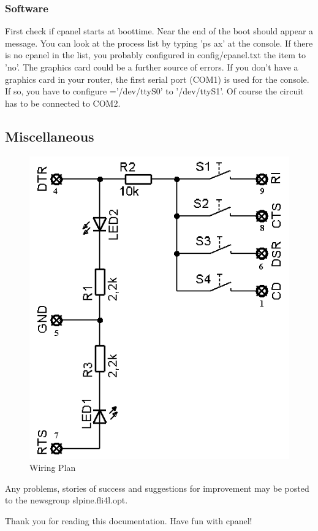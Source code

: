 \subsubsection{Software}

First check if cpanel starts at boottime. Near the end of the boot should appear a message. 
You can look at the process list by typing 'ps ax' at the console. If there is no cpanel in 
the list, you probably configured in config/cpanel.txt the item  to 'no'. 
The graphics card could be a further source of errors. If you don't have a graphics card
in your router, the first serial port (COM1) is used for the console. If so, you have to
configure ='/dev/ttyS0' to '/dev/ttyS1'. Of course the circuit has to be
connected to COM2.

\subsection{Miscellaneous}

  \begin{figure}[htbp]
    \centering
    \includegraphics[width=485pt]{schematic}
    \caption{Wiring Plan}
    \label{fig:schaltplan}
  \end{figure}



Any problems, stories of success and suggestions for improvement may be posted to the newsgroup slpine.fli4l.opt.

Thank you for reading this documentation. Have fun with cpanel!
